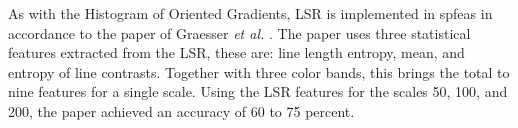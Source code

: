 As with the Histogram of Oriented Gradients, LSR is implemented in spfeas in accordance to the paper of Graesser \textit{et al.} \cite{graesser2012image}. The paper uses three statistical features extracted from the LSR, these are: line length entropy, mean, and entropy of line contrasts. Together with three color bands, this brings the total to nine features for a single scale. Using the LSR features for the scales 50, 100, and 200, the paper achieved an accuracy of 60 to 75 percent.



